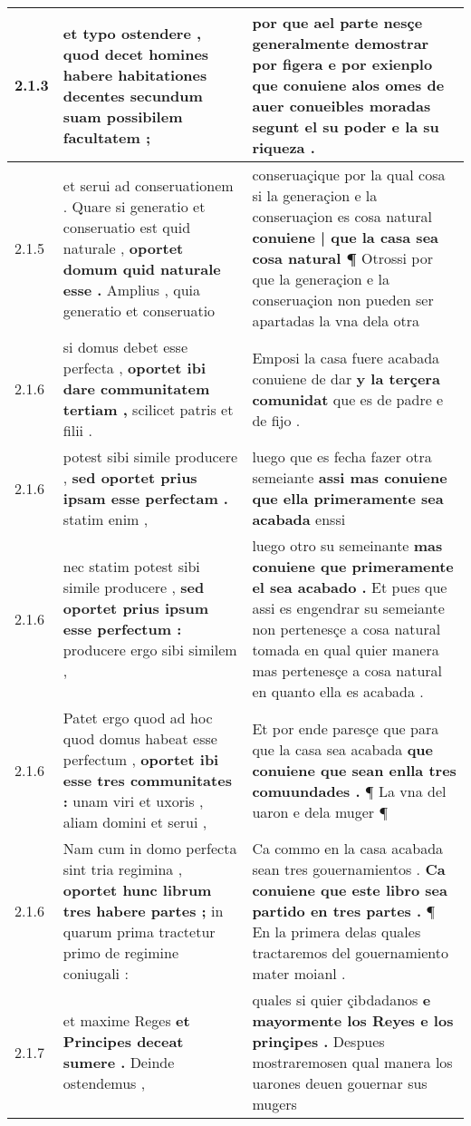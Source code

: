\begin{tabular}{|p{1cm}|p{6.5cm}|p{6.5cm}|}
2.1.3 & et typo ostendere , \textbf{ quod decet homines habere habitationes decentes } secundum suam possibilem facultatem ; & por que ael parte nesçe generalmente demostrar \textbf{ por figera e por exienplo que conuiene alos omes de auer conueibles moradas } segunt el su poder e la su riqueza . \\\hline
2.1.5 & et serui ad conseruationem . Quare si generatio et conseruatio est quid naturale , \textbf{ oportet domum quid naturale esse . } Amplius , quia generatio et conseruatio & conseruaçique por la qual cosa si la generaçion e la conseruaçion es cosa natural \textbf{ conuiene | que la casa sea cosa natural ¶ } Otrossi por que la generaçion e la conseruaçion non pueden ser apartadas la vna dela otra \\\hline
2.1.6 & si domus debet esse perfecta , \textbf{ oportet ibi dare communitatem tertiam , } scilicet patris et filii . & Emposi la casa fuere acabada conuiene de dar \textbf{ y la terçera comunidat } que es de padre e de fijo . \\\hline
2.1.6 & potest sibi simile producere , \textbf{ sed oportet prius ipsam esse perfectam . } statim enim , & luego que es fecha fazer otra semeiante \textbf{ assi mas conuiene que ella primeramente sea acabada } enssi \\\hline
2.1.6 & nec statim potest sibi simile producere , \textbf{ sed oportet prius ipsum esse perfectum : } producere ergo sibi similem , & luego otro su semeinante \textbf{ mas conuiene que primeramente el sea acabado . } Et pues que assi es engendrar su semeiante non pertenesçe a cosa natural tomada en qual quier manera mas pertenesçe a cosa natural en quanto ella es acabada . \\\hline
2.1.6 & Patet ergo quod ad hoc quod domus habeat esse perfectum , \textbf{ oportet ibi esse tres communitates : } unam viri et uxoris , aliam domini et serui , & Et por ende paresçe que para que la casa sea acabada \textbf{ que conuiene que sean enlla tres comuundades . } ¶ La vna del uaron e dela muger ¶ \\\hline
2.1.6 & Nam cum in domo perfecta sint tria regimina , \textbf{ oportet hunc librum tres habere partes ; } in quarum prima tractetur primo de regimine coniugali : & Ca commo en la casa acabada sean tres gouernamientos . \textbf{ Ca conuiene que este libro sea partido en tres partes . } ¶ En la primera delas quales tractaremos del gouernamiento mater moianl . \\\hline
2.1.7 & et maxime Reges \textbf{ et Principes deceat sumere . } Deinde ostendemus , & quales si quier çibdadanos \textbf{ e mayormente los Reyes e los prinçipes . } Despues mostraremosen qual manera los uarones deuen gouernar sus mugers \\\hline

\end{tabular}
